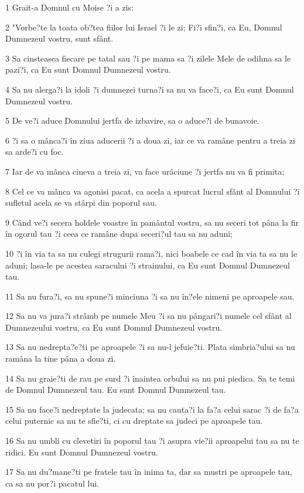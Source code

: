 \par 1 Grait-a Domnul cu Moise ?i a zis:
\par 2 "Vorbe?te la toata ob?tea fiilor lui Israel ?i le zi; Fi?i sfin?i, ca Eu, Domnul Dumnezeul vostru, sunt sfânt.
\par 3 Sa cinsteasca fiecare pe tatal sau ?i pe mama sa ?i zilele Mele de odihna sa le pazi?i, ca Eu sunt Domnul Dumnezeul vostru.
\par 4 Sa nu alerga?i la idoli ?i dumnezei turna?i sa nu va face?i, ca Eu sunt Domnul Dumnezeul vostru.
\par 5 De ve?i aduce Domnului jertfa de izbavire, sa o aduce?i de bunavoie.
\par 6 ?i sa o mânca?i în ziua aducerii ?i a doua zi, iar ce va ramâne pentru a treia zi sa arde?i cu foc.
\par 7 Iar de va mânca cineva a treia zi, va face urâciune ?i jertfa nu va fi primita;
\par 8 Cel ce va mânca va agonisi pacat, ca acela a spurcat lucrul sfânt al Domnului ?i sufletul acela se va stârpi din poporul sau.
\par 9 Când ve?i secera holdele voastre în pamântul vostru, sa nu seceri tot pâna la fir în ogorul tau ?i ceea ce ramâne dupa seceri?ul tau sa nu aduni;
\par 10 ?i în via ta sa nu culegi strugurii rama?i, nici boabele ce cad în via ta sa nu le aduni; lasa-le pe acestea saracului ?i strainului, ca Eu sunt Domnul Dumnezeul tau.
\par 11 Sa nu fura?i, sa nu spune?i minciuna ?i sa nu în?ele nimeni pe aproapele sau.
\par 12 Sa nu va jura?i strâmb pe numele Meu ?i sa nu pângari?i numele cel sfânt al Dumnezeului vostru, ca Eu sunt Domnul Dumnezeul vostru.
\par 13 Sa nu nedrepta?e?ti pe aproapele ?i sa nu-l jefuie?ti. Plata simbria?ului sa nu ramâna la tine pâna a doua zi.
\par 14 Sa nu graie?ti de rau pe surd ?i înaintea orbului sa nu pui piedica. Sa te temi de Domnul Dumnezeul tau. Eu sunt Domnul Dumnezeul tau.
\par 15 Sa nu face?i nedreptate la judecata; sa nu cauta?i la fa?a celui sarac ?i de fa?a celui puternic sa nu te sfie?ti, ci cu dreptate sa judeci pe aproapele tau.
\par 16 Sa nu umbli cu clevetiri în poporul tau ?i asupra vie?ii aproapelui tau sa nu te ridici. Eu sunt Domnul Dumnezeul vostru.
\par 17 Sa nu du?mane?ti pe fratele tau în inima ta, dar sa mustri pe aproapele tau, ca sa nu por?i pacatul lui.
